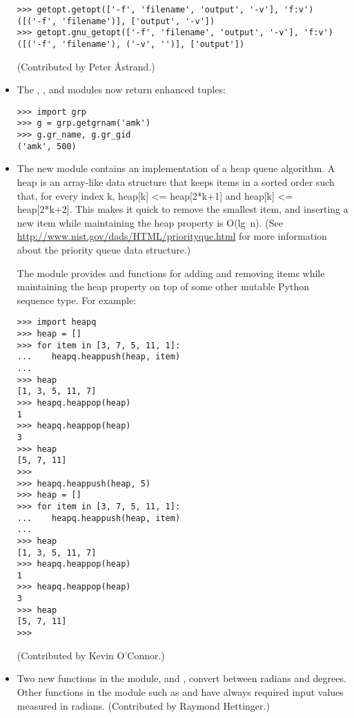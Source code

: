 \documentclass{howto}
\begin{document}
\begin{itemize}
\begin{verbatim}
>>> getopt.getopt(['-f', 'filename', 'output', '-v'], 'f:v')
([('-f', 'filename')], ['output', '-v'])
>>> getopt.gnu_getopt(['-f', 'filename', 'output', '-v'], 'f:v')
([('-f', 'filename'), ('-v', '')], ['output'])
\end{verbatim}

(Contributed by Peter \AA{strand}.)

\item The , , and  modules
now return enhanced tuples:

\begin{verbatim}
>>> import grp
>>> g = grp.getgrnam('amk')
>>> g.gr_name, g.gr_gid
('amk', 500)
\end{verbatim}

\item The new  module contains an implementation of a
heap queue algorithm.  A heap is an array-like data structure that
keeps items in a sorted order such that, for every index k, heap[k] <=
heap[2*k+1] and heap[k] <= heap[2*k+2].  This makes it quick to remove
the smallest item, and inserting a new item while maintaining the heap
property is O(lg~n).  (See
\url{http://www.nist.gov/dads/HTML/priorityque.html} for more
information about the priority queue data structure.)

The  module provides  and
 functions for adding and removing items while
maintaining the heap property on top of some other mutable Python
sequence type.  For example:

\begin{verbatim}
>>> import heapq
>>> heap = []
>>> for item in [3, 7, 5, 11, 1]:
...    heapq.heappush(heap, item)
...
>>> heap
[1, 3, 5, 11, 7]
>>> heapq.heappop(heap)
1
>>> heapq.heappop(heap)
3
>>> heap
[5, 7, 11]
>>>
>>> heapq.heappush(heap, 5)
>>> heap = []
>>> for item in [3, 7, 5, 11, 1]:
...    heapq.heappush(heap, item)
...
>>> heap
[1, 3, 5, 11, 7]
>>> heapq.heappop(heap)
1
>>> heapq.heappop(heap)
3
>>> heap
[5, 7, 11]
>>>
\end{verbatim}

(Contributed by Kevin O'Connor.)

\item Two new functions in the  module,
 and ,
convert between radians and degrees.  Other functions in the
 module such as
 and  have always required
input values measured in radians. (Contributed by Raymond Hettinger.)


\end{itemize}
\end{document}
